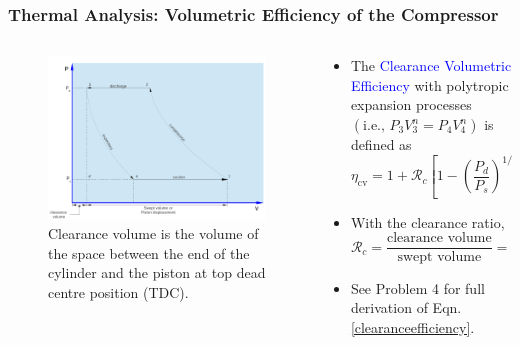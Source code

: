 \documentclass[10pt,compress]{beamer}
\newcommand{\frc}{\displaystyle\frac}
\begin{document}
\begin{frame}
 \frametitle{Thermal Analysis: Volumetric Efficiency of the Compressor}
 \begin{columns}
  \begin{column}[c]{0.45\linewidth}
   \begin{figure}%
      \includegraphics[width=5.cm,height=5.cm,clip]{./Pics/Overview_Refrig29}
    \caption{Clearance volume is the volume of the space between the end of the cylinder and the piston at top dead centre position (TDC).}
   \end{figure}  
  \end{column}  
  \begin{column}[c]{0.55\linewidth}
   \begin{itemize}
    \item <1-> The \textcolor{blue}{Clearance Volumetric Efficiency} with polytropic expansion processes $\left(\text{i.e., }P_{3}V_{3}^{n}=P_{4}V_{4}^{n}\right)$ is defined as 
     \begin{equation}
        \eta_{\text{cv}} = 1 + \mathcal{R}_{c}\left[1-\left(\frc{P_{d}}{P_{s}}\right)^{1/n}\right] \label{clearanceefficiency}
     \end{equation}
    \item <2-> With the clearance ratio,
     \begin{displaymath}
      \mathcal{R}_{c}=\frc{\text{clearance volume}}{\text{swept volume}}=\frc{V_{3}}{V_{1}-V_{3}}
     \end{displaymath}
    \item <3->  See Problem 4 for full derivation of Eqn. \ref{clearanceefficiency}.
   \end{itemize}
  \end{column}  
 \end{columns}
\end{frame}
\end{document}
